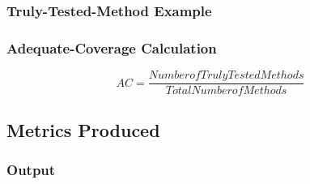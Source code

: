 \begin{frame}
  \frametitle{Truly-Tested-Method Example}
  \begin{center}

  \begin{table}[htbp]

  \end{table}

  \end{center}
\end{frame}

\begin{frame}
\frametitle{Adequate-Coverage Calculation}
\begin{center}
  \begin{equation*}
    AC = \frac{Number of TrulyTested Methods}{Total Number of Methods}
  \end{equation*}
\end{center}
\end{frame}

\subsection{Metrics Produced}
\begin{frame}
  \frametitle{Output}
    \begin{center}

    \begin{table}[htbp]
      \centering

    \end{table}

    \end{center}
\end{frame}
